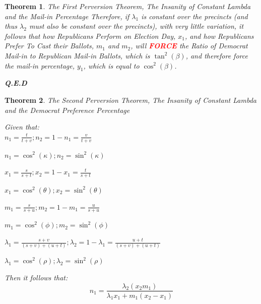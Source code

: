 \documentclass[preprint,13pt]{elsarticle}
\newtheorem{theorem}{Theorem}[section]
\begin{document}
\begin{theorem}{The First Perversion Theorem, The Insanity of Constant Lambda and the Mail-in Percentage}
Therefore, if $\lambda_{1}$ is constant over the precincts (and thus $\lambda_{2}$ must also be constant over the precincts), with very little variation, it follows that how Republicans Perform on Election Day, $x_{1}$, and how Republicans Prefer To Cast their Ballots, $m_{1}$ and $m_{2}$, will \textbf{\textcolor{red}{FORCE}} the Ratio of Democrat Mail-in to Republican Mail-in Ballots, which is $\tan^{2}(\beta)$, and therefore force the mail-in percentage, $y_{1}$, which is equal to $\cos^{2}(\beta)$.
\begin{flushright}
\textbf{Q.E.D}
\end{flushright}
\end{theorem}
\newpage
\begin{theorem}{The Second Perversion Theorem, The Insanity of Constant Lambda and the Democrat Preference Percentage}

Given that:\\
$n_{1}=\frac{t}{t+v};n_{2}=1-n_{1}=\frac{v}{t+v}$

$n_{1}=\cos^{2}(\kappa); n_{2}=\sin^{2}(\kappa)$

$x_{1}=\frac{s}{s+t};x_{2}=1-x_{1}=\frac{t}{s+t}$

$x_{1}=\cos^{2}(\theta); x_{2}=\sin^{2}(\theta)$

$m_{1}=\frac{s}{s+u};m_{2}=1-m_{1}=\frac{u}{s+u}$

$m_{1}=\cos^{2}(\phi); m_{2}=\sin^{2}(\phi)$

$\lambda_{1}=\frac{s+v}{(s+v)+(u+t)};\lambda_{2}=1-\lambda_{1}=\frac{u+t}{(s+v)+(u+t)}$

$\lambda_{1}=\cos^{2}(\rho); \lambda_{2}=\sin^{2}(\rho)$

Then it follows that:
$$n_{1}=\frac{\lambda_{2}(x_{2}m_{1})}{\lambda_{1}x_{1}+m_{1}(x_{2}-x_{1})}$$


\end{theorem}
\end{document}
